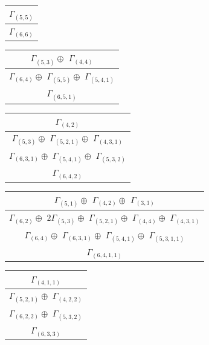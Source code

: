 \documentclass[main.tex]{subfiles}
\begin{document}
\begin{minipage}{.2\textwidth}
\centering
\begin{tabular}{c}
$\Gamma_{(
5 , 
5
)}$
\\ \hline
$\Gamma_{(
6 , 
6
)}$
\\
\end{tabular}\end{minipage}
\begin{minipage}{.3\textwidth}
\centering
\begin{tabular}{c}
$\Gamma_{(
5 , 
3
)} \oplus$
$\Gamma_{(
4 , 
4
)}$
\\ \hline
$\Gamma_{(
6 , 
4
)} \oplus$
$\Gamma_{(
5 , 
5
)} \oplus$
$\Gamma_{(
5 , 
4 , 
1
)}$
\\ \hline
$\Gamma_{(
6 , 
5 , 
1
)}$
\\
\end{tabular}\end{minipage}
\begin{minipage}{.3\textwidth}
\centering
\begin{tabular}{c}
$\Gamma_{(
4 , 
2
)}$
\\ \hline
$\Gamma_{(
5 , 
3
)} \oplus$
$\Gamma_{(
5 , 
2 , 
1
)} \oplus$
$\Gamma_{(
4 , 
3 , 
1
)}$
\\ \hline
$\Gamma_{(
6 , 
3 , 
1
)} \oplus$
$\Gamma_{(
5 , 
4 , 
1
)} \oplus$
$\Gamma_{(
5 , 
3 , 
2
)}$
\\ \hline
$\Gamma_{(
6 , 
4 , 
2
)}$
\\
\end{tabular}\end{minipage}
\bigskip
\begin{minipage}{.6\textwidth}
\centering
\begin{tabular}{c}
$\Gamma_{(
5 , 
1
)} \oplus$
$\Gamma_{(
4 , 
2
)} \oplus$
$\Gamma_{(
3 , 
3
)}$
\\ \hline
$\Gamma_{(
6 , 
2
)} \oplus$
$ 2 \Gamma_{(
5 , 
3
)} \oplus$
$\Gamma_{(
5 , 
2 , 
1
)} \oplus$
$\Gamma_{(
4 , 
4
)} \oplus$
$\Gamma_{(
4 , 
3 , 
1
)}$
\\ \hline
$\Gamma_{(
6 , 
4
)} \oplus$
$\Gamma_{(
6 , 
3 , 
1
)} \oplus$
$\Gamma_{(
5 , 
4 , 
1
)} \oplus$
$\Gamma_{(
5 , 
3 , 
1 , 
1
)}$
\\ \hline
$\Gamma_{(
6 , 
4 , 
1 , 
1
)}$
\\
\end{tabular}\end{minipage}
\begin{minipage}{.4\textwidth}
\centering
\begin{tabular}{c}
$\Gamma_{(
4 , 
1 , 
1
)}$
\\ \hline
$\Gamma_{(
5 , 
2 , 
1
)} \oplus$
$\Gamma_{(
4 , 
2 , 
2
)}$
\\ \hline
$\Gamma_{(
6 , 
2 , 
2
)} \oplus$
$\Gamma_{(
5 , 
3 , 
2
)}$
\\ \hline
$\Gamma_{(
6 , 
3 , 
3
)}$
\\
\end{tabular}\end{minipage}
\end{document}
